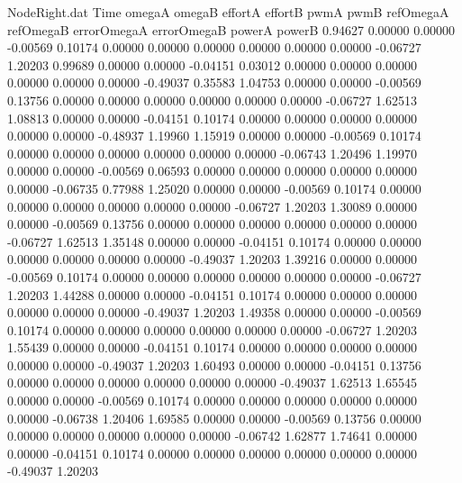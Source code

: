 \begin{filecontents}{NodeRight.dat}
Time omegaA omegaB effortA effortB pwmA pwmB refOmegaA refOmegaB errorOmegaA errorOmegaB powerA powerB
   0.94627    0.00000    0.00000    -0.00569    0.10174    0.00000    0.00000    0.00000    0.00000    0.00000    0.00000   -0.06727    1.20203
   0.99689    0.00000    0.00000    -0.04151    0.03012    0.00000    0.00000    0.00000    0.00000    0.00000    0.00000   -0.49037    0.35583
   1.04753    0.00000    0.00000    -0.00569    0.13756    0.00000    0.00000    0.00000    0.00000    0.00000    0.00000   -0.06727    1.62513
   1.08813    0.00000    0.00000    -0.04151    0.10174    0.00000    0.00000    0.00000    0.00000    0.00000    0.00000   -0.48937    1.19960
   1.15919    0.00000    0.00000    -0.00569    0.10174    0.00000    0.00000    0.00000    0.00000    0.00000    0.00000   -0.06743    1.20496
   1.19970    0.00000    0.00000    -0.00569    0.06593    0.00000    0.00000    0.00000    0.00000    0.00000    0.00000   -0.06735    0.77988
   1.25020    0.00000    0.00000    -0.00569    0.10174    0.00000    0.00000    0.00000    0.00000    0.00000    0.00000   -0.06727    1.20203
   1.30089    0.00000    0.00000    -0.00569    0.13756    0.00000    0.00000    0.00000    0.00000    0.00000    0.00000   -0.06727    1.62513
   1.35148    0.00000    0.00000    -0.04151    0.10174    0.00000    0.00000    0.00000    0.00000    0.00000    0.00000   -0.49037    1.20203
   1.39216    0.00000    0.00000    -0.00569    0.10174    0.00000    0.00000    0.00000    0.00000    0.00000    0.00000   -0.06727    1.20203
   1.44288    0.00000    0.00000    -0.04151    0.10174    0.00000    0.00000    0.00000    0.00000    0.00000    0.00000   -0.49037    1.20203
   1.49358    0.00000    0.00000    -0.00569    0.10174    0.00000    0.00000    0.00000    0.00000    0.00000    0.00000   -0.06727    1.20203
   1.55439    0.00000    0.00000    -0.04151    0.10174    0.00000    0.00000    0.00000    0.00000    0.00000    0.00000   -0.49037    1.20203
   1.60493    0.00000    0.00000    -0.04151    0.13756    0.00000    0.00000    0.00000    0.00000    0.00000    0.00000   -0.49037    1.62513
   1.65545    0.00000    0.00000    -0.00569    0.10174    0.00000    0.00000    0.00000    0.00000    0.00000    0.00000   -0.06738    1.20406
   1.69585    0.00000    0.00000    -0.00569    0.13756    0.00000    0.00000    0.00000    0.00000    0.00000    0.00000   -0.06742    1.62877
   1.74641    0.00000    0.00000    -0.04151    0.10174    0.00000    0.00000    0.00000    0.00000    0.00000    0.00000   -0.49037    1.20203

\end{filecontents}

